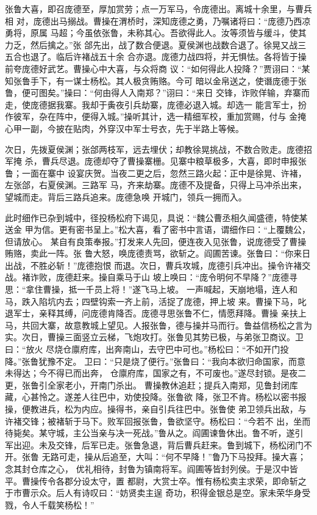 张鲁大喜，即召庞德至，厚加赏劳；点一万军马，令庞德出。离城十余里，与曹兵相
对，庞德出马搦战。曹操在渭桥时，深知庞德之勇，乃嘱诸将曰：“庞德乃西凉勇将，原属
马超；今虽依张鲁，未称其心。吾欲得此人。汝等须皆与缓斗，使其力乏，然后擒之。”张
郃先出，战了数合便退。夏侯渊也战数合退了。徐晃又战三五合也退了。临后许褚战五十余
合亦退。庞德力战四将，并无惧怯。各将皆于操前夸庞德好武艺。曹操心中大喜，与众将商
议：“如何得此人投降？”贾诩曰：“某知张鲁手下，有一谋士杨松。其人极贪贿赂。今可
暗以金帛送之，使谮庞德于张鲁，便可图矣。”操曰：“何由得人入南郑？”诩曰：“来日
交锋，诈败佯输，弃寨而走，使庞德据我寨。我却于夤夜引兵劫寨，庞德必退入城。却选一
能言军士，扮作彼军，杂在阵中，便得入城。”操听其计，选一精细军校，重加赏赐，付与
金掩心甲一副，今披在贴肉，外穿汉中军士号衣，先于半路上等候。

次日，先拨夏侯渊；张郃两枝军，远去埋伏；却教徐晃挑战，不数合败走。庞德招军掩
杀，曹兵尽退。庞德却夺了曹操寨栅。见寨中粮草极多，大喜，即时申报张鲁；一面在寨中
设宴庆贺。当夜二更之后，忽然三路火起：正中是徐晃、许褚，左张郃，右夏侯渊。三路军
马，齐来劫寨。庞德不及提备，只得上马冲杀出来，望城而走。背后三路兵追来。庞德急唤
开城门，领兵一拥而入。

此时细作已杂到城中，径投杨松府下谒见，具说：“魏公曹丞相久闻盛德，特使某送金
甲为信。更有密书呈上。”松大喜，看了密书中言语，谓细作曰：“上覆魏公，但请放心。
某自有良策奉报。”打发来人先回，便连夜入见张鲁，说庞德受了曹操贿赂，卖此一阵。张
鲁大怒，唤庞德责骂，欲斩之。阎圃苦谏。张鲁曰：“你来日出战，不胜必斩！”庞德抱恨
而退。次日，曹兵攻城，庞德引兵冲出。操令许褚交战。褚诈败，庞德赶来。操自乘马于山
坡上唤曰：“庞令明何不早降？”庞德寻思：“拿住曹操，抵一千员上将！”遂飞马上坡。
一声喊起，天崩地塌，连人和马，跌入陷坑内去；四壁钩索一齐上前，活捉了庞德，押上坡
来。曹操下马，叱退军士，亲释其缚，问庞德肯降否。庞德寻思张鲁不仁，情愿拜降。曹操
亲扶上马，共回大寨，故意教城上望见。人报张鲁，德与操并马而行。鲁益信杨松之言为
实。次日，曹操三面竖立云梯，飞炮攻打。张鲁见其势已极，与弟张卫商议。卫曰：“放火
尽烧仓廪府库，出奔南山，去守巴中可也。”杨松曰：“不如开门投降。”张鲁犹豫不定。
卫曰：“只是烧了便行。”张鲁曰：“我向本欲归命国家，而意未得达；今不得已而出奔，
仓廪府库，国家之有，不可废也。”遂尽封锁。是夜二更，张鲁引全家老小，开南门杀出。
曹操教休追赶；提兵入南郑，见鲁封闭库藏，心甚怜之。遂差人往巴中，劝使投降。张鲁欲
降，张卫不肯。杨松以密书报操，便教进兵，松为内应。操得书，亲自引兵往巴中。张鲁使
弟卫领兵出敌，与许褚交锋；被褚斩于马下。败军回报张鲁，鲁欲坚守。杨松曰：“今若不
出，坐而待毙矣。某守城，主公当亲与决一死战。”鲁从之。阎圃谏鲁休出。鲁不听，遂引
军出迎。未及交锋，后军已走。张鲁急退，背后曹兵赶来。鲁到城下，杨松闭门不开。张鲁
无路可走，操从后追至，大叫：“何不早降！”鲁乃下马投拜。操大喜；念其封仓库之心，
优礼相待，封鲁为镇南将军。阎圃等皆封列侯。于是汉中皆平。曹操传令各郡分设太守，置
都尉，大赏士卒。惟有杨松卖主求荣，即命斩之于市曹示众。后人有诗叹曰：“妨贤卖主逞
奇功，积得金银总是空。家未荣华身受戮，令人千载笑杨松！”

